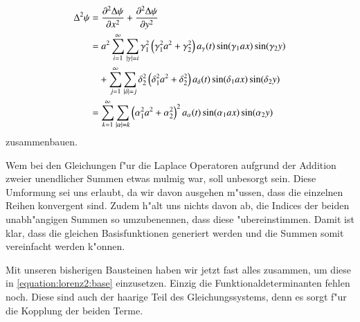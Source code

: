 \begin{align*}
\laplace^2\psi
&= 
\frac{\partial^2\laplace\psi}{\partial x^2} + 
\frac{\partial^2\laplace\psi}{\partial y^2}
\\
&=
a^2
\sum_{i = 1}^{\infty}
\sum_{|\gamma| = i}
\gamma_1^2
\left(\gamma_1^2 a^2+\gamma_2^2\right)
a_{\gamma}(t)
\sin(\gamma_1 ax) \sin(\gamma_2 y)
\\
&\phantom{={}}
+
\sum_{j = 1}^{\infty}
\sum_{|\delta| = j}
\delta_2^2
\left(\delta_1^2 a^2+\delta_2^2\right)
a_{\delta}(t)
\sin(\delta_1 ax) \sin(\delta_2 y)
\\
&=
\sum_{k = 1}^{\infty}
\sum_{|\alpha| = k}
\left(\alpha_1^2 a^2+\alpha_2^2\right)^2
a_{\alpha}(t)
\sin(\alpha_1 ax) \sin(\alpha_2 y)
\end{align*}
zusammenbauen.

Wem bei den Gleichungen f"ur die Laplace Operatoren aufgrund der Addition 
zweier unendlicher Summen etwas mulmig war, soll unbesorgt sein. Diese 
Umformung sei uns erlaubt, da wir davon ausgehen m"ussen, dass die einzelnen 
Reihen konvergent sind. Zudem h"alt uns nichts davon ab, die 
Indices der beiden unabh"angigen Summen so umzubenennen, dass diese 
"ubereinstimmen. Damit ist klar, dass die gleichen Basisfunktionen generiert 
werden und die Summen somit vereinfacht werden k"onnen.

Mit unseren bisherigen Bausteinen haben wir jetzt fast alles zusammen, um diese 
in \cref{equation:lorenz2:base} einzusetzen. Einzig die Funktionaldeterminanten 
fehlen noch. Diese sind auch der haarige Teil des Gleichungssystems, denn es 
sorgt f"ur die Kopplung der beiden Terme.

